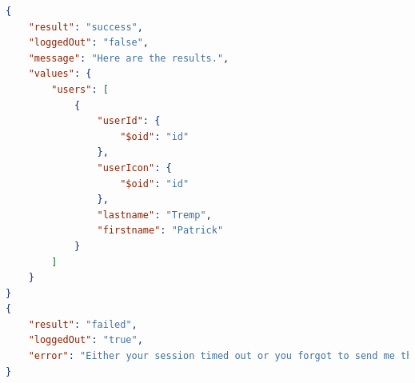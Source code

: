 \begin{lstlisting}[language=json,firstnumber=1]
{
    "result": "success",
    "loggedOut": "false",
    "message": "Here are the results.",
    "values": {
        "users": [
            {
                "userId": {
                    "$oid": "id"
                },
                "userIcon": {
                    "$oid": "id"
                },
                "lastname": "Tremp",
                "firstname": "Patrick"
            }
        ]
    }
}
{
    "result": "failed",
    "loggedOut": "true",
    "error": "Either your session timed out or you forgot to send me the session and credentials."
}
\end{lstlisting}



